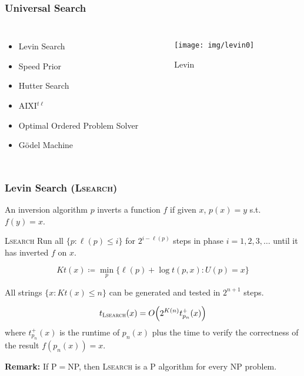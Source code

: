 \documentclass[UTF8,11pt,colorlinks,compress,openany]{beamer}%
\begin{document}
\begin{frame}\frametitle{Universal Search}
	\begin{columns}
			\begin{itemize}
				\item Levin Search
				\item Speed Prior
				\item Hutter Search
				\item AIXI$^{t\ell}$
				\item Optimal Ordered Problem Solver
				\item G\"odel Machine
			\end{itemize}
			\begin{figure}
				\texttt{[image: img/levin0]}\caption{Levin}
			\end{figure}
	\end{columns}
\end{frame}

\begin{frame}\frametitle{Levin Search (\textsc{Lsearch})}
\setlength\abovedisplayskip{0pt}
\setlength\belowdisplayskip{0pt}
	An inversion algorithm $p$ inverts a function $f$ if given $x$, $p(x)=y$ s.t. $f(y)=x$.
	\begin{block}{\textsc{Lsearch}}
		Run all $\{p: \ell(p)\leq i\}$ for $2^{i-\ell(p)}$ steps in phase $i=1,2,3,\ldots$ until it has inverted $f$ on $x$.
	\end{block}\vspace{-2ex}
	\[
	Kt(x)\coloneqq \min\limits_p\big\{\ell(p)+\log t(p,x): U(p)=x\big\}
	\]\vspace{-2ex}
	\begin{theorem}
		All strings $\{x: Kt(x) \leq n\}$ can be generated and tested in $2^{n+1}$ steps.
	\end{theorem}\vspace{-2ex}
	\[t_{\textsc{Lsearch}}(x)=O\Big(2^{K(n)}t^+_{p_n}(x)\Big)\] where $t^+_{p_n}(x)$ is the runtime of $p_n(x)$ plus the time to verify the correctness of the result $f(p_n(x))=x$.
	
	\textbf{Remark:} If P$=$NP, then \textsc{Lsearch} is a P algorithm for every NP problem.
\end{frame}
\end{document}
